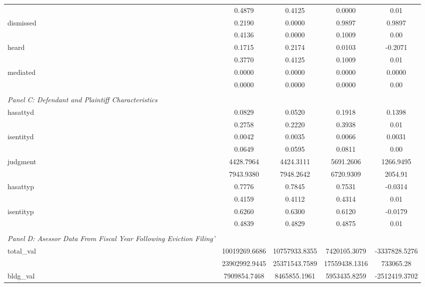 {\begin{tabular}{l*{4}{c}}
            &     0.4879 &     0.4125 &     0.0000 &        0.01\\
dismissed   &     0.2190 &     0.0000 &     0.9897 &      0.9897\\
            &     0.4136 &     0.0000 &     0.1009 &        0.00\\
heard       &     0.1715 &     0.2174 &     0.0103 &     -0.2071\\
            &     0.3770 &     0.4125 &     0.1009 &        0.01\\
mediated    &     0.0000 &     0.0000 &     0.0000 &      0.0000\\
            &     0.0000 &     0.0000 &     0.0000 &        0.00\\
\vspace{0.1em} \\ \emph{Panel C: Defendant and Plaintiff Characteristics}&            &            &            &            \\
hasattyd    &     0.0829 &     0.0520 &     0.1918 &      0.1398\\
            &     0.2758 &     0.2220 &     0.3938 &        0.01\\
isentityd   &     0.0042 &     0.0035 &     0.0066 &      0.0031\\
            &     0.0649 &     0.0595 &     0.0811 &        0.00\\
judgment    &  4428.7964 &  4424.3111 &  5691.2606 &   1266.9495\\
            &  7943.9380 &  7948.2642 &  6720.9309 &     2054.91\\
hasattyp    &     0.7776 &     0.7845 &     0.7531 &     -0.0314\\
            &     0.4159 &     0.4112 &     0.4314 &        0.01\\
isentityp   &     0.6260 &     0.6300 &     0.6120 &     -0.0179\\
            &     0.4839 &     0.4829 &     0.4875 &        0.01\\
\vspace{0.1em} \\ \emph{Panel D: Asessor Data From Fiscal Year Following Eviction Filing'}&            &            &            &            \\
total\_val   &10019269.6686 &10757933.8355 &7420105.3079 & -3337828.5276\\
            &23902992.9445 &25371543.7589 &17559438.1316 &   733065.28\\
bldg\_val    &7909854.7468 &8465855.1961 &5953435.8259 & -2512419.3702\\

\end{tabular}}

